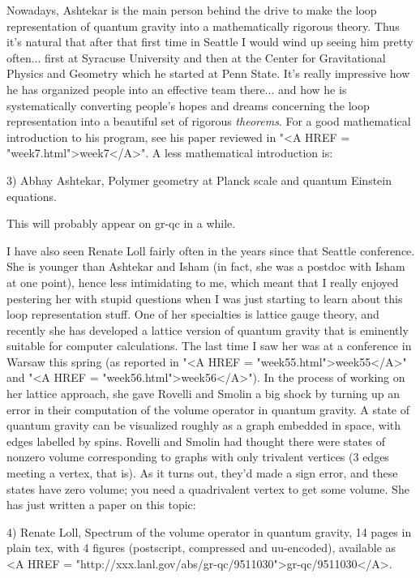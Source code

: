 Nowadays, Ashtekar is the main person behind the drive to make the loop
representation of quantum gravity into a mathematically rigorous theory.
Thus it's natural that after that first time in Seattle I would wind up
seeing him pretty often... first at Syracuse University and then at the
Center for Gravitational Physics and Geometry which he started at Penn
State.  It's really impressive how he has organized people into an
effective team there... and how he is systematically converting people's
hopes and dreams concerning the loop representation into a beautiful set
of rigorous \emph{theorems}.  For a good mathematical introduction to his
program, see his paper reviewed in "<A HREF = "week7.html">week7</A>".
A less mathematical introduction is:

3) Abhay Ashtekar, Polymer geometry at Planck scale and quantum Einstein
equations.  

This will probably appear on gr-qc in a while.  

I have also seen Renate Loll fairly often in the years since that
Seattle conference.  She is younger than Ashtekar and Isham (in fact,
she was a postdoc with Isham at one point), hence less intimidating to
me, which meant that I really enjoyed pestering her with stupid
questions when I was just starting to learn about this loop
representation stuff.  One of her specialties is lattice gauge theory,
and recently she has developed a lattice version of quantum gravity that
is eminently suitable for computer calculations.  The last time I saw
her was at a conference in Warsaw this spring (as reported in "<A HREF =
"week55.html">week55</A>" 
and "<A HREF = "week56.html">week56</A>").  In the process of working on
her lattice approach, she gave Rovelli and Smolin a big shock by turning
up an error in their 
computation of the volume operator in quantum gravity.  A state of
quantum gravity can be visualized roughly as a graph embedded in space,
with edges labelled by spins.  Rovelli and Smolin had thought there were
states of nonzero volume corresponding to graphs with only trivalent
vertices (3 edges meeting a vertex, that is).  As it turns out, they'd
made a sign error, and these states have zero volume; you need a
quadrivalent vertex to get some volume.  She has just written a paper on
this topic:

4) Renate Loll, Spectrum of the volume operator in quantum gravity, 
14 pages in plain tex, with 4 figures (postscript, compressed and
uu-encoded), available as <A HREF =
"http://xxx.lanl.gov/abs/gr-qc/9511030">gr-qc/9511030</A>.   

